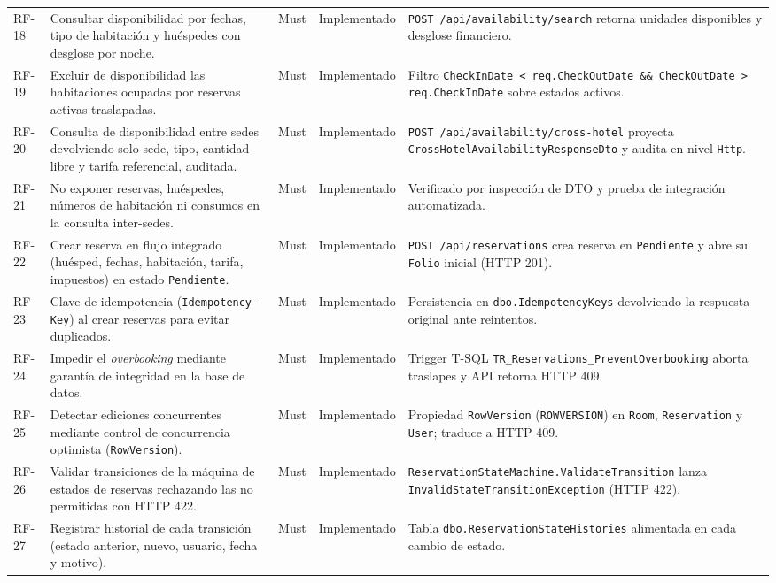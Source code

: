 \documentclass[12pt,a4paper]{article}
\begin{document}
\begin{longtable}{p{1.3cm} p{5.2cm} p{1.3cm} p{2.2cm} p{4.4cm}}
RF-18 & Consultar disponibilidad por fechas, tipo de habitaci\'on y hu\'espedes con desglose por noche. & Must & Implementado & \texttt{POST /api/availability/search} retorna unidades disponibles y desglose financiero.\\[0.1cm]
RF-19 & Excluir de disponibilidad las habitaciones ocupadas por reservas activas traslapadas. & Must & Implementado & Filtro \texttt{CheckInDate < req.CheckOutDate \&\& CheckOutDate > req.CheckInDate} sobre estados activos.\\[0.1cm]
RF-20 & Consulta de disponibilidad entre sedes devolviendo solo sede, tipo, cantidad libre y tarifa referencial, auditada. & Must & Implementado & \texttt{POST /api/availability/cross-hotel} proyecta \texttt{CrossHotelAvailabilityResponseDto} y audita en nivel \texttt{Http}.\\[0.1cm]
RF-21 & No exponer reservas, hu\'espedes, n\'umeros de habitaci\'on ni consumos en la consulta inter-sedes. & Must & Implementado & Verificado por inspecci\'on de DTO y prueba de integraci\'on automatizada.\\[0.1cm]
RF-22 & Crear reserva en flujo integrado (hu\'esped, fechas, habitaci\'on, tarifa, impuestos) en estado \texttt{Pendiente}. & Must & Implementado & \texttt{POST /api/reservations} crea reserva en \texttt{Pendiente} y abre su \texttt{Folio} inicial (HTTP 201).\\[0.1cm]
RF-23 & Clave de idempotencia (\texttt{Idempotency-Key}) al crear reservas para evitar duplicados. & Must & Implementado & Persistencia en \texttt{dbo.IdempotencyKeys} devolviendo la respuesta original ante reintentos.\\[0.1cm]
RF-24 & Impedir el \textit{overbooking} mediante garant\'ia de integridad en la base de datos. & Must & Implementado & Trigger T-SQL \texttt{TR\_Reservations\_PreventOverbooking} aborta traslapes y API retorna HTTP 409.\\[0.1cm]
RF-25 & Detectar ediciones concurrentes mediante control de concurrencia optimista (\texttt{RowVersion}). & Must & Implementado & Propiedad \texttt{RowVersion} (\texttt{ROWVERSION}) en \texttt{Room}, \texttt{Reservation} y \texttt{User}; traduce a HTTP 409.\\[0.1cm]
RF-26 & Validar transiciones de la m\'aquina de estados de reservas rechazando las no permitidas con HTTP 422. & Must & Implementado & \texttt{ReservationStateMachine.ValidateTransition} lanza \texttt{InvalidStateTransitionException} (HTTP 422).\\[0.1cm]
RF-27 & Registrar historial de cada transici\'on (estado anterior, nuevo, usuario, fecha y motivo). & Must & Implementado & Tabla \texttt{dbo.ReservationStateHistories} alimentada en cada cambio de estado.\\[0.1cm]

\end{longtable}
\end{document}
